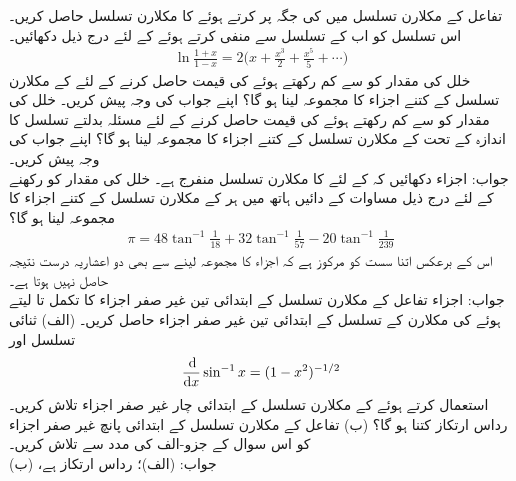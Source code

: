 تفاعل  کے مکلارن تسلسل میں  کی جگہ  پر کرتے ہوئے  کا مکلارن تسلسل حاصل کریں۔ اس تسلسل کو اب  کے تسلسل سے منفی کرتے ہوئے  کے لئے درج ذیل دکھائیں۔
\begin{align*}
\ln\frac{1+x}{1-x}=2\big(x+\frac{x^3}{2}+\frac{x^5}{5}+\cdots\big)
\end{align*}
خلل کی مقدار کو  سے  کم رکھتے ہوئے  کی قیمت حاصل کرنے کے لئے  کے مکلارن تسلسل کے کتنے اجزاء کا مجموعہ لینا ہو گا؟ اپنے جواب کی وجہ پیش کریں۔
خلل کی مقدار کو  سے  کم رکھتے ہوئے  کی قیمت حاصل کرنے کے لئے مسئلہ بدلتے تسلسل کا اندازہ کے تحت    کے مکلارن تسلسل کے کتنے اجزاء کا مجموعہ لینا ہو گا؟ اپنے جواب کی وجہ پیش کریں۔\\
جواب:\quad
{} اجزاء
دکھائیں کہ  کے لئے  کا مکلارن تسلسل منفرج ہے۔
خلل کی مقدار کو  رکھنے کے لئے درج ذیل مساوات کے دائیں ہاتھ میں ہر  کے مکلارن تسلسل کے کتنے اجزاء کا مجموعہ لینا ہو گا؟ 
\begin{align*}
\pi=48\tan^{-1}\frac{1}{18}+32\tan^{-1}\frac{1}{57}-20\tan^{-1}\frac{1}{239}
\end{align*}
اس کے برعکس  اتنا سست  کو مرکوز ہے کہ  اجزاء کا مجموعہ لینے سے بھی دو اعشاریہ درست نتیجہ حاصل نہیں ہوتا ہے۔\\
جواب:\quad
{} اجزاء
تفاعل  کے مکلارن تسلسل کے ابتدائی تین غیر صفر اجزاء کا تکمل  تا  لیتے ہوئے  کی مکلارن کے تسلسل کے ابتدائی تین غیر صفر اجزاء حاصل کریں۔ 
(الف) ثنائی تسلسل اور
\begin{align*}
\frac{\dif}{\dif x}\sin^{-1}x=(1-x^2)^{-1/2}
\end{align*}
استعمال کرتے ہوئے   کے مکلارن تسلسل کے ابتدائی چار غیر صفر اجزاء تلاش کریں۔رداس ارتکاز کتنا ہو گا؟ (ب) تفاعل  کے مکلارن تسلسل کے ابتدائی پانچ غیر صفر اجزاء کو اس سوال کے جزو-الف کی مدد سے تلاش کریں۔\\
جواب:\quad
  (الف)؛ رداس ارتکاز  ہے، (ب) 
